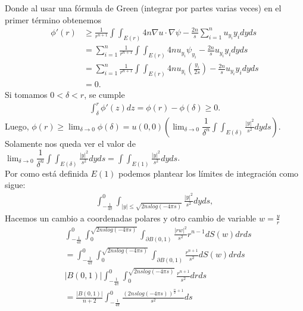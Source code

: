 \begin{homeworkProblem}
\begin{solucion}
    Donde al usar una fórmula de Green (integrar por partes varias veces) en el primer término obtenemos
    \begin{align*}
      \phi ' (r) &\geq \frac{1}{r^{n+1}} \int \int_{E(r)} 4n \nabla u \cdot \nabla \psi - \frac{2n}{s} \displaystyle \sum_{i=1}^{n} u_{y_{i}}y_{i} dyds\\ 
                 &=\displaystyle \sum_{i=1}^{n} \frac{1}{r^{n+1}} \int \int_{E(r)} 4n u_{y_{i}} \psi_{y_{i}} - \frac{2n}{s} u_{y_{i}}y_{i} dyds\\ 
                 &= \displaystyle \sum_{i=1}^{n} \frac{1}{r^{n+1}} \int \int_{E(r)} 4n u_{y_{i}} \left( \frac{y_{i}}{2s}\right) - \frac{2n}{s} u_{y_{i}}y_{i} dyds\\ 
                 &=0.
    \end{align*} 
    Si tomamos $0< \delta < r$, se cumple
    \begin{align*}
      \int_{\delta}^{r} \phi '(z) dz = \phi(r) - \phi(\delta) \geq 0.
    \end{align*}
    Luego, $\phi(r) \geq \lim_{\delta \rightarrow 0} \phi(\delta) = u(0,0) \left(\lim_{\delta \rightarrow 0} \dfrac{1}{\delta ^{n}} \displaystyle \int \displaystyle \int_{E(\delta)} \frac{|y|^{2}}{s^{2}} dyds\right)$.\\ 
    Solamente nos queda ver el valor de $\lim_{\delta \rightarrow 0} \dfrac{1}{\delta ^{n}} \displaystyle \int \displaystyle \int_{E(\delta)} \frac{|y|^{2}}{s^{2}} dyds = \displaystyle \int \displaystyle \int_{E(1)} \frac{|y|^{2}}{s^{2}} dyds$.\\ 
    Por como está definida $E(1)$ podemos plantear los límites de integración como sigue:
    \begin{align*}
      \int_{-\frac{1}{4\pi}}^{0} \int_{|y| \leq \sqrt{2nslog(-4\pi s)}} \frac{|y|^{2}}{s^{2}} dyds,
    \end{align*}
    Hacemos un cambio a coordenadas polares y otro cambio de variable $w = \frac{y}{r}$
    \begin{align*}
      &\int_{-\frac{1}{4\pi}}^{0} \int_{0}^{\sqrt{2nslog(-4\pi s)}} \int_{\partial B(0,1)} \frac{|rw|^{2}}{s^{2}} r^{n-1} dS(w)drds\\
      &= \int_{-\frac{1}{4\pi}}^{0} \int_{0}^{\sqrt{2nslog(-4\pi s)}} \int_{\partial B(0,1)} \frac{r^{n+1}}{s^{2}} dS(w)drds\\
      &|B(0,1)| \int_{-\frac{1}{4\pi}}^{0} \int_{0}^{\sqrt{2nslog(-4\pi s)}} \frac{r^{n+1}}{s^{2}} drds\\ 
      &= \frac{|B(0,1)|}{n+2} \int_{-\frac{1}{4\pi}}^{0} \frac{(2nslog(-4\pi s))^{\frac{n}{2} + 1}}{s^{2}} ds\\ 

\end{align*}
\end{solucion}
\end{homeworkProblem}
